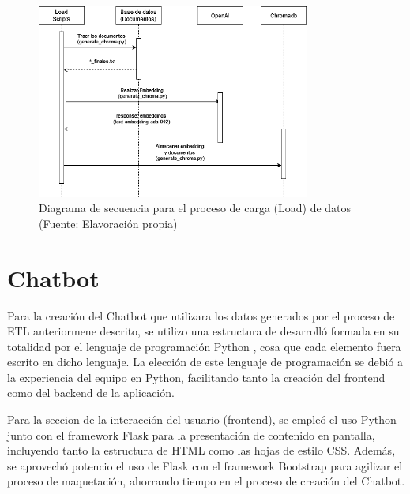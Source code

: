 \begin{figure}[ht!]
    \centering
    \includegraphics[width=0.8\textwidth]{figures/load_diagram.png}
    \caption[Diagrama de secuencia para el proceso de carga (Load) de datos]{Diagrama de secuencia para el proceso de carga (Load)  de datos\\
    {\scriptsize (Fuente: Elavoración propia)}}
    \label{fig:load_diagram}
\end{figure}

\newpage



\section{Chatbot}

   
Para la creación del Chatbot que utilizara los datos generados por el proceso de ETL anteriormene descrito, se utilizo
una estructura de desarrolló formada en su totalidad por el lenguaje de programación Python \cite{pythonWelcomePythonorg}, cosa que cada elemento fuera escrito en dicho lenguaje. 
La elección de este lenguaje de programación se debió a la experiencia del equipo en Python, facilitando tanto la creación del frontend como del backend de la aplicación.

Para la seccion de la interacción del usuario (frontend), se empleó el uso Python junto con el framework Flask \cite{flask1} para la presentación  
de contenido en pantalla, incluyendo tanto la estructura de HTML como las hojas de estilo CSS. Además, se aprovechó potencio el uso de Flask con el  
framework Bootstrap para agilizar el proceso de maquetación, ahorrando tiempo en el proceso de creación del Chatbot.

